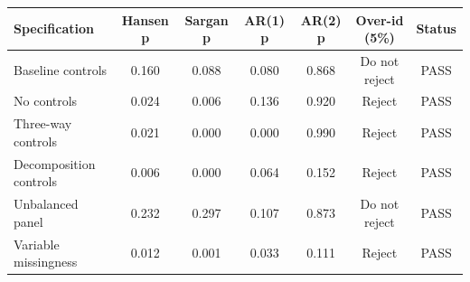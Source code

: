 \begin{tabular}{lcccccc}
\toprule
Specification & Hansen p & Sargan p & AR(1) p & AR(2) p & Over-id (5\%) & Status \\
\midrule
Baseline controls & 0.160 & 0.088 & 0.080 & 0.868 & Do not reject & PASS \\
No controls & 0.024 & 0.006 & 0.136 & 0.920 & Reject & PASS \\
Three-way controls & 0.021 & 0.000 & 0.000 & 0.990 & Reject & PASS \\
Decomposition controls & 0.006 & 0.000 & 0.064 & 0.152 & Reject & PASS \\
Unbalanced panel & 0.232 & 0.297 & 0.107 & 0.873 & Do not reject & PASS \\
Variable missingness & 0.012 & 0.001 & 0.033 & 0.111 & Reject & PASS \\
\bottomrule
\end{tabular}